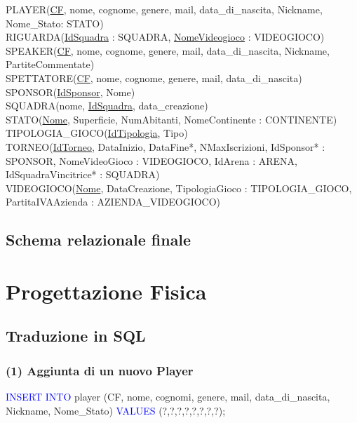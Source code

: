 \documentclass[a4paper,12pt]{report}
\begin{document}
\noindent PLAYER(\underline{CF}, nome, cognome, genere, mail, data\_di\_nascita, Nickname, Nome\_Stato: STATO) \\

\noindent RIGUARDA(\underline{IdSquadra} : SQUADRA, \underline{NomeVideogioco} : VIDEOGIOCO) \\

\noindent SPEAKER(\underline{CF}, nome, cognome, genere, mail, data\_di\_nascita, Nickname, PartiteCommentate) \\

\noindent SPETTATORE(\underline{CF}, nome, cognome, genere, mail, data\_di\_nascita) \\

\noindent SPONSOR(\underline{IdSponsor}, Nome) \\

\noindent SQUADRA(nome, \underline{IdSquadra}, data\_creazione) \\

\noindent STATO(\underline{Nome}, Superficie, NumAbitanti, NomeContinente : CONTINENTE) \\

\noindent TIPOLOGIA\_GIOCO(\underline{IdTipologia}, Tipo) \\

\noindent TORNEO(\underline{IdTorneo}, DataInizio, DataFine*, NMaxIscrizioni, IdSponsor* : SPONSOR, NomeVideoGioco : VIDEOGIOCO, IdArena : ARENA, IdSquadraVincitrice* : SQUADRA) \\

\noindent VIDEOGIOCO(\underline{Nome}, DataCreazione, TipologiaGioco : TIPOLOGIA\_GIOCO, PartitaIVAAzienda : AZIENDA\_VIDEOGIOCO) \\







\section{Schema relazionale finale}


\chapter{Progettazione Fisica}
\section{Traduzione in SQL}
\subsection*{(1) Aggiunta di un nuovo Player}
\textcolor{blue}{INSERT INTO} player (CF, nome, cognomi, genere, mail, data\_di\_nascita, Nickname, Nome\_Stato)
\textcolor{blue}{VALUES} (?,?,?,?,?,?,?,?);
\end{document}
